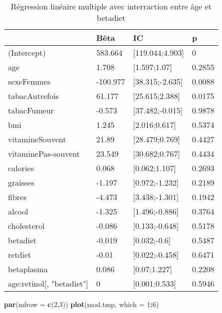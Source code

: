 \documentclass[]{article}
\newenvironment{Shaded}{\begin{snugshade}}{\end{snugshade}}
\newcommand{\KeywordTok}[1]{\textcolor[rgb]{0.13,0.29,0.53}{\textbf{#1}}}
\newcommand{\DataTypeTok}[1]{\textcolor[rgb]{0.13,0.29,0.53}{#1}}
\newcommand{\DecValTok}[1]{\textcolor[rgb]{0.00,0.00,0.81}{#1}}
\newcommand{\OperatorTok}[1]{\textcolor[rgb]{0.81,0.36,0.00}{\textbf{#1}}}
\newcommand{\NormalTok}[1]{#1}
\begin{document}
\begin{table}

\caption{\label{tab:unnamed-chunk-57}Régression linéaire multiple avec interraction entre âge et betadiet}
\centering
\begin{tabular}[t]{l|l|l|l}
\hline
  & Bêta & IC & p\\
\hline
\rowcolor[HTML]{BBD2E1}  (Intercept) & 583.664 & [119.044;4.903] & 0\\
\hline
age & 1.708 & [1.597;1.07] & 0.2855\\
\hline
\rowcolor[HTML]{BBD2E1}  sexeFemmes & -100.977 & [38.315;-2.635] & 0.0088\\
\hline
tabacAutrefois & 61.177 & [25.615;2.388] & 0.0175\\
\hline
\rowcolor[HTML]{BBD2E1}  tabacFumeur & -0.573 & [37.482;-0.015] & 0.9878\\
\hline
bmi & 1.245 & [2.016;0.617] & 0.5374\\
\hline
\rowcolor[HTML]{BBD2E1}  vitamineSouvent & 21.89 & [28.479;0.769] & 0.4427\\
\hline
vitaminePas-souvent & 23.549 & [30.682;0.767] & 0.4434\\
\hline
\rowcolor[HTML]{BBD2E1}  calories & 0.068 & [0.062;1.107] & 0.2693\\
\hline
graisses & -1.197 & [0.972;-1.232] & 0.2189\\
\hline
\rowcolor[HTML]{BBD2E1}  fibres & -4.473 & [3.438;-1.301] & 0.1942\\
\hline
alcool & -1.325 & [1.496;-0.886] & 0.3764\\
\hline
\rowcolor[HTML]{BBD2E1}  cholesterol & -0.086 & [0.133;-0.648] & 0.5178\\
\hline
betadiet & -0.019 & [0.032;-0.6] & 0.5487\\
\hline
\rowcolor[HTML]{BBD2E1}  retdiet & -0.01 & [0.022;-0.458] & 0.6471\\
\hline
betaplasma & 0.086 & [0.07;1.227] & 0.2208\\
\hline
\rowcolor[HTML]{BBD2E1}  age:retinol[, "betadiet"] & 0 & [0.001;0.533] & 0.5946\\
\hline
\end{tabular}
\end{table}

\begin{Shaded}
\begin{Highlighting}[]
\KeywordTok{par}\NormalTok{(}\DataTypeTok{mfrow =} \KeywordTok{c}\NormalTok{(}\DecValTok{2}\NormalTok{,}\DecValTok{3}\NormalTok{))}
\KeywordTok{plot}\NormalTok{(mod.tmp, }\DataTypeTok{which =} \DecValTok{1}\OperatorTok{:}\DecValTok{6}\NormalTok{)}
\end{Highlighting}
\end{Shaded}
\end{document}

